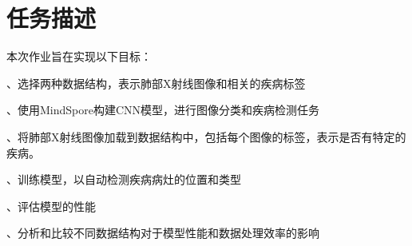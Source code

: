 
\section{任务描述}
\noindent 本次作业旨在实现以下目标：

、选择两种数据结构，表示肺部X射线图像和相关的疾病标签

、使用MindSpore构建CNN模型，进行图像分类和疾病检测任务

、将肺部X射线图像加载到数据结构中，包括每个图像的标签，表示是否有特定的疾病。

、训练模型，以自动检测疾病病灶的位置和类型

、评估模型的性能

、分析和比较不同数据结构对于模型性能和数据处理效率的影响
